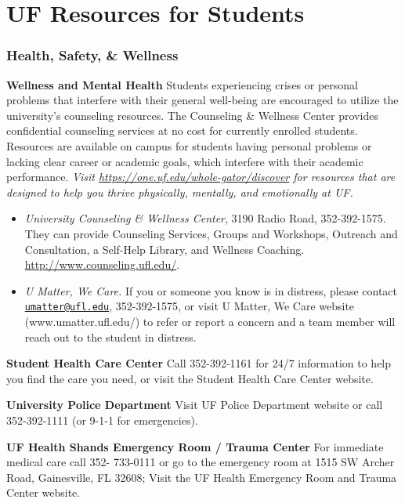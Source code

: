 \documentclass[
  10pt,
  letterpaper,
  oneside,
  open=any]{scrbook}
\begin{document}

\chapter{UF Resources for Students}\label{uf-resources-for-students}

\subsection{Health, Safety, \& Wellness}\label{health-safety-wellness}

\textbf{Wellness and Mental Health} Students experiencing crises or
personal problems that interfere with their general well-being are
encouraged to utilize the university's counseling resources. The
Counseling \& Wellness Center provides confidential counseling services
at no cost for currently enrolled students. Resources are available on
campus for students having personal problems or lacking clear career or
academic goals, which interfere with their academic performance.
\emph{Visit \url{https://one.uf.edu/whole-gator/discover} for resources
that are designed to help you thrive physically, mentally, and
emotionally at UF.}

\begin{itemize}
\item
  \emph{University Counseling \& Wellness Center}, 3190 Radio Road,
  352-392-1575. They can provide Counseling Services, Groups and
  Workshops, Outreach and Consultation, a Self-Help Library, and
  Wellness Coaching. \url{http://www.counseling.ufl.edu/}.
\item
  \emph{U Matter, We Care.} If you or someone you know is in distress,
  please contact
  \href{mailto:umatter@ufl.edu}{\nolinkurl{umatter@ufl.edu}},
  352-392-1575, or visit U Matter, We Care website
  (www.umatter.ufl.edu/) to refer or report a concern and a team member
  will reach out to the student in distress.
\end{itemize}

\textbf{Student Health Care Center} Call 352-392-1161 for 24/7
information to help you find the care you need, or visit the Student
Health Care Center website.

\textbf{University Police Department} Visit UF Police Department website
or call 352-392-1111 (or 9-1-1 for emergencies).

\textbf{UF Health Shands Emergency Room / Trauma Center} For immediate
medical care call 352- 733-0111 or go to the emergency room at 1515 SW
Archer Road, Gainesville, FL 32608; Visit the UF Health Emergency Room
and Trauma Center website.
\end{document}
